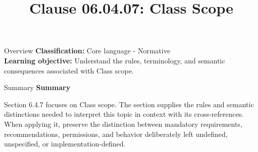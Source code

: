 \documentclass[10pt,letterpaper]{article}
\title{Clause 06.04.07: Class Scope}
\author{}
\date{}
\begin{document}
\maketitle
\begin{CornellOverviewBox}{Overview}
\textbf{Classification:} Core language - Normative\\[2pt]
\textbf{Learning objective:} Understand the rules, terminology, and semantic consequences associated with Class scope.
\end{CornellOverviewBox}\begin{CornellSummaryBox}{Summary}
{\sffamily\bfseries\color{Accent} Summary}\par\vspace{3pt}Section 6.4.7 focuses on Class scope. The section supplies the rules and semantic distinctions needed to interpret this topic in context with its cross-references. When applying it, preserve the distinction between mandatory requirements, recommendations, permissions, and behavior deliberately left undefined, unspecified, or implementation-defined.
\end{CornellSummaryBox}
\end{document}
